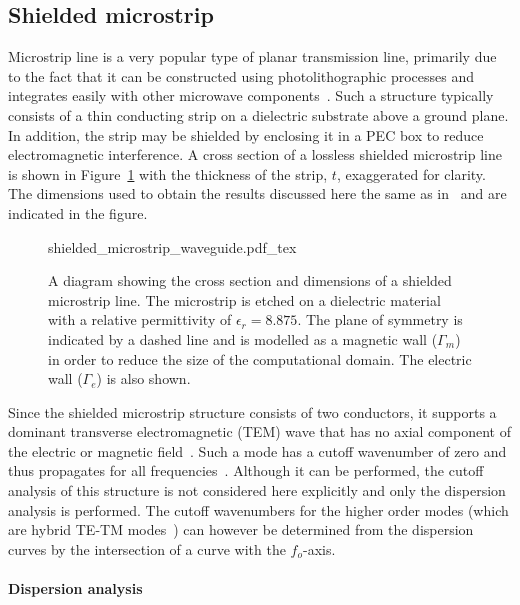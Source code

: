 \subsection{Shielded microstrip}
\label{lezar:sec:shielded_microstrip}
Microstrip line is a very popular type of planar transmission line, primarily due to the fact that it can be constructed using photolithographic processes and integrates easily with other microwave components~\citep{Pozar2005}. Such a structure typically consists of a thin conducting strip on a dielectric substrate above a ground plane. In addition, the strip may be shielded by enclosing it in a PEC box to reduce electromagnetic interference. A cross section of a lossless shielded microstrip line is shown in Figure~\ref{fig:lezar:shielded_microstrip} with the thickness of the strip, $t$, exaggerated for clarity. The dimensions used to obtain the results discussed here the same as in~\citet{PelosiCoccioliSelleri1998} and are indicated in the figure.
\begin{figure}[t]
    \centering
    \def\svgwidth{\smallfig}
    {shielded_microstrip_waveguide.pdf_tex}
    \caption{A diagram showing the cross section and dimensions of a shielded microstrip line. The microstrip is etched on a dielectric material with a relative permittivity of $\epsilon_r = 8.875$. The plane of symmetry is indicated by a dashed line and is modelled as a magnetic wall ($\Gamma_m$) in order to reduce the size of the computational domain. The electric wall ($\Gamma_e$) is also shown.}
    \label{fig:lezar:shielded_microstrip}
\end{figure}

Since the shielded microstrip structure consists of two conductors, it supports a dominant transverse electromagnetic (TEM) wave that has no axial component of the electric or magnetic field~\citep{Pozar2005}. Such a mode has a cutoff wavenumber of zero and thus propagates for all frequencies~\citep{Jin2002,PelosiCoccioliSelleri1998}. Although it can be performed, the cutoff analysis of this structure is not considered here explicitly and only the dispersion analysis is performed. The cutoff wavenumbers for the higher order modes (which are hybrid TE-TM modes~\citep{Pozar2005}) can however be determined from the dispersion curves by the intersection of a curve with the $f_o$-axis.

\paragraph{Dispersion analysis}


